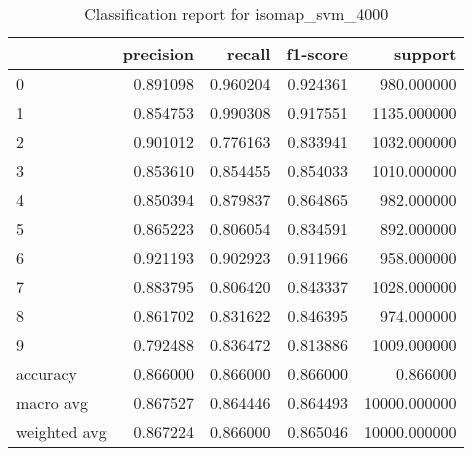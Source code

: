 \begin{table}[htb!]
\centering
\caption{Classification report for isomap_svm_4000}
\label{tab:classification-report-isomap_svm_4000}
\begin{tabular}{lrrrr}
\toprule
 & precision & recall & f1-score & support \\
\midrule
0 & 0.891098 & 0.960204 & 0.924361 & 980.000000 \\
1 & 0.854753 & 0.990308 & 0.917551 & 1135.000000 \\
2 & 0.901012 & 0.776163 & 0.833941 & 1032.000000 \\
3 & 0.853610 & 0.854455 & 0.854033 & 1010.000000 \\
4 & 0.850394 & 0.879837 & 0.864865 & 982.000000 \\
5 & 0.865223 & 0.806054 & 0.834591 & 892.000000 \\
6 & 0.921193 & 0.902923 & 0.911966 & 958.000000 \\
7 & 0.883795 & 0.806420 & 0.843337 & 1028.000000 \\
8 & 0.861702 & 0.831622 & 0.846395 & 974.000000 \\
9 & 0.792488 & 0.836472 & 0.813886 & 1009.000000 \\
accuracy & 0.866000 & 0.866000 & 0.866000 & 0.866000 \\
macro avg & 0.867527 & 0.864446 & 0.864493 & 10000.000000 \\
weighted avg & 0.867224 & 0.866000 & 0.865046 & 10000.000000 \\
\bottomrule
\end{tabular}
\end{table}
